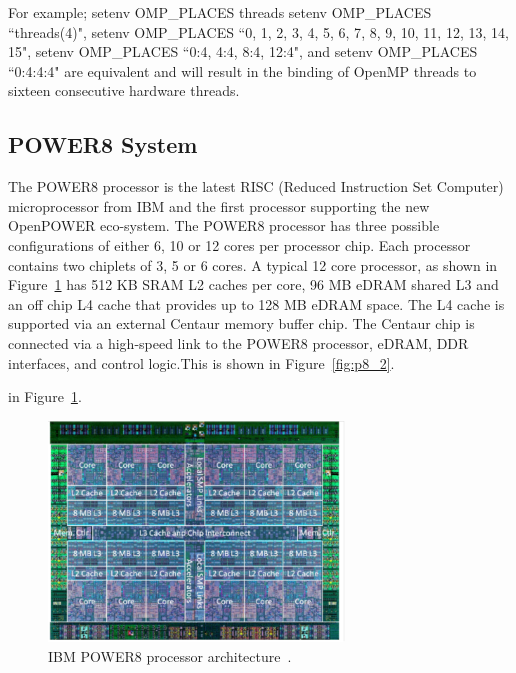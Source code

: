 For example; setenv OMP\_PLACES threads
setenv OMP\_PLACES ``threads(4)", setenv OMP\_PLACES ``{0, 1, 2, 3}, {4, 5, 6, 7},{ 8, 9, 10, 11},{ 12, 13, 14, 15}", setenv OMP\_PLACES ``{0:4}, {4:4}, {8:4}, {12:4}", and setenv OMP\_PLACES ``{0:4}:4:4" are equivalent and will result in the binding of OpenMP threads to sixteen consecutive hardware threads. 

\subsection{POWER8 System}
The POWER8 processor is the latest RISC (Reduced Instruction Set Computer) microprocessor from IBM and the first processor supporting the new OpenPOWER eco-system. 
The POWER8 processor has three possible configurations of either 6, 10 or 12 cores per processor chip. Each processor contains two chiplets of 3, 5 or 6 cores.  A typical 12 core processor, as shown in Figure~\ref{fig:p8_1} has  512 KB SRAM L2 caches per core, 96 MB eDRAM shared L3 and an off chip L4 cache that provides up to 128 MB eDRAM space. The L4 cache is supported via an external Centaur memory buffer chip. The Centaur chip is connected via a high-speed link to the POWER8 processor, eDRAM, DDR interfaces, and control logic.This is shown in Figure~\ref{fig:p8_2}. 

 in Figure~\ref{fig:p8_1}.

\begin{figure}[h!]
  \centering
  \includegraphics[height=0.4\textwidth, width=0.7\textwidth]{./Images/P8.pdf}
       \caption{IBM POWER8 processor architecture~\cite{IBM_P8}.}
       \label{fig:p8_1}
\end{figure}

